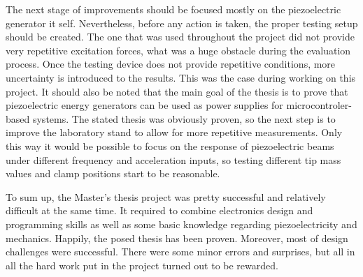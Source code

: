 \documentclass[12pt,a4paper]{article}
\begin{document}
\par
The next stage of improvements should be focused mostly on the piezoelectric generator it self. Nevertheless, before any action is taken, the proper testing setup should be created. The one that was used throughout the project did not provide very repetitive excitation forces, what was a huge obstacle during the evaluation process. Once the testing device does not provide repetitive conditions, more uncertainty is introduced to the results. This was the case during working on this project. It should also be noted that the main goal of the thesis is to prove that piezoelectric energy generators can be used as power supplies for microcontroler-based systems. The stated thesis was obviously proven, so the next step is to improve the laboratory stand to allow for more repetitive measurements. Only this way it would be possible to focus on the response of piezoelectric beams under different frequency and acceleration inputs, so testing different tip mass values and clamp positions start to be reasonable.
\par
To sum up, the Master's thesis project was pretty successful and relatively difficult at the same time. It required to combine electronics design and programming skills as well as some basic knowledge regarding piezoelectricity and mechanics. Happily, the posed thesis has been proven. Moreover, most of design challenges were successful. There were some minor errors and surprises, but all in all the hard work put in the project turned out to be rewarded.

\FloatBarrier
\clearpage

\printbibliography

% 
%

\clearpage
\end{document}
